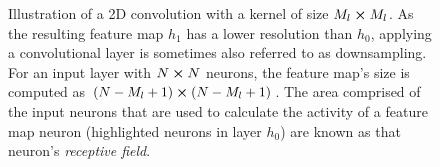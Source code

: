 \begin{figure}
    \centering
{}
\caption[Illustration of receptive field in 2D convolutional layer]{Illustration of a 2D convolution with a kernel of size $M_l\cp M_l$. As the resulting feature map $h_1$ has a lower resolution than $h_0$, applying a convolutional layer is sometimes also referred to as downsampling. For an input layer with $N\cp N$ neurons, the feature map's size is computed as $(N-M_l+1)\cp (N-M_l+1)$. The area comprised of the input neurons that are used to calculate the activity of a feature map neuron (highlighted neurons in layer $h_0$) are known as that neuron's \emph{receptive field}.}\label{fig:2dconvolution}
\end{figure}\noindent

